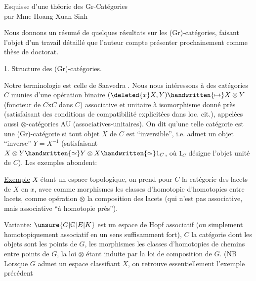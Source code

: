 
\begin{center}
Esquisse d'une théorie des Gr-Catégories\\
par Mme Hoang Xuan Sinh
\end{center}

Nous donnons un résumé de quelques résultats sur les (Gr)-catégories, faisant l'objet d'un travail détaillé que l'auteur compte présenter prochainement comme thèse de doctorat\handwritten{[\, ]}.

1. Structure des (Gr)-catégories.

Notre terminologie est celle de Saavedra \handwritten{[\, ]}. Nous nous intéressons à des catégories $C$ munies d'une opération binaire $(\deleted{x}X,Y)\handwritten{\mapsto}X\otimes Y$ (foncteur de $C\mathbin{\mathrm{x}}C$ dans $C$) associative et unitaire à isomorphisme donné près (satisfaisant des conditions de compatibilité explicitées dans loc. cit.), appelées aussi $\otimes$-catégories AU (associatives-unitaires). On dit qu'une telle catégorie est une (Gr)-catégorie si  tout objet $X$ de $C$ est ``inversible'', i.e. admet un objet ``inverse'' $Y=X^{-1}$ (satisfaisant $X\otimes Y\handwritten{\simeq}Y\otimes X\handwritten{\simeq}1_C$, où $1_C$ désigne l'objet unité de $C$). Les exemples abondent:

\uline{Exemple}  $X$ étant un espace topologique, on prend pour $C$ la catégorie des lacets de $X$ en $x$, avec comme morphismes les classes d'homotopie d'homotopies entre lacets, comme opération $\otimes$ la composition des lacets (qui n'est pas associative, mais associative ``à homotopie près'').

Variante: $\unsure{G|\mathbb{G}|E|K}$ est un espace de Hopf associatif (ou simplement homotopiquement associatif en un sens suffisamment fort), $C$ la catégorie dont les objets sont les points de $G$, les morphismes les classes d'homotopies de chemins entre points de $G$, la loi $\otimes$ étant induite par la loi de composition de $G$. (NB Lorsque $G$ admet un espace classifiant $X$, on retrouve essentiellement l'exemple précédent


